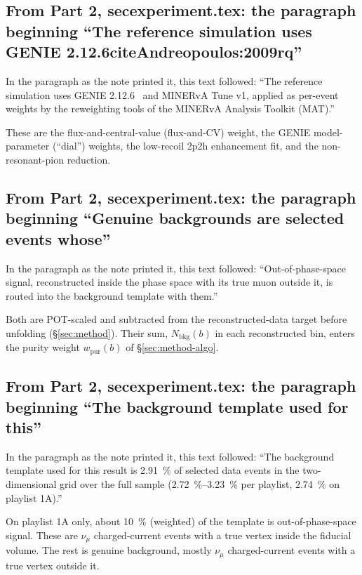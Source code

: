 \subsection{From Part 2, secexperiment.tex: the paragraph beginning ``The reference simulation uses GENIE 2.12.6citeAndreopoulos:2009rq''}
In the paragraph as the note printed it, this text followed: ``The reference simulation uses GENIE 2.12.6~\cite{Andreopoulos:2009rq} and MINERvA Tune v1, applied as per-event weights by the reweighting tools of the MINERvA Analysis Toolkit (MAT).''\par
These are the flux-and-central-value (flux-and-CV) weight, the GENIE model-parameter (``dial'') weights, the low-recoil 2p2h enhancement fit, and the non-resonant-pion reduction.

\subsection{From Part 2, secexperiment.tex: the paragraph beginning ``Genuine backgrounds are selected events whose''}
In the paragraph as the note printed it, this text followed: ``Out-of-phase-space signal, reconstructed inside the phase space with its true muon outside it, is routed into the background template with them.''\par
Both are POT-scaled and subtracted from the reconstructed-data target before unfolding (\S\ref{sec:method}). Their sum, $N_{\mathrm{bkg}}(b)$ in each reconstructed bin, enters the purity weight $w_{\mathrm{pur}}(b)$ of \S\ref{sec:method-algo}.

\subsection{From Part 2, secexperiment.tex: the paragraph beginning ``The background template used for this''}
In the paragraph as the note printed it, this text followed: ``The background template used for this result is \SI{2.91}{\percent} of selected data events in the two-dimensional grid over the full sample (\SIrange{2.72}{3.23}{\percent} per playlist, \SI{2.74}{\percent} on playlist 1A).''\par
On playlist 1A only, about \SI{10}{\percent} (weighted) of the template is out-of-phase-space signal. These are $\nu_{\mu}$ charged-current events with a true vertex inside the fiducial volume. The rest is genuine background, mostly $\nu_{\mu}$ charged-current events with a true vertex outside it.

